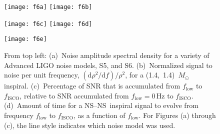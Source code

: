 \documentclass[preprint2]{aastex}
\newcommand{\NS}{NS}
\newcommand{\Msun}{\ensuremath{M_{\odot}}}
\begin{document}
\begin{figure}[b]
	\texttt{[image: f6a]}%
	\texttt{[image: f6b]}

	\texttt{[image: f6c]}%
	\texttt{[image: f6d]}

	\texttt{[image: f6e]}

	\caption{\label{fig:low-frequency-cutoff}From top left:  (a)~Noise amplitude spectral density for a variety of Advanced LIGO noise models, S5, and S6.  (b)~Normalized signal to noise per unit frequency, $(\mathrm{d}\rho^2/\mathrm{d}f)/\rho^2$, for a (1.4,~1.4)~$\Msun$ inspiral.  (c)~Percentage of SNR that is accumulated from $f_\mathrm{low}$ to $f_\mathrm{ISCO}$, relative to SNR accumulated from $f_\mathrm{low} = 0\,\mathrm{Hz}$ to $f_\mathrm{ISCO}$.    (d)~Amount of time for a \NS--\NS\ inspiral signal to evolve from frequency $f_\mathrm{low}$ to $f_\mathrm{ISCO}$, as a function of $f_\mathrm{low}$.  For Figures (a) through (c), the line style indicates which noise model was used.}
\end{figure}



\end{document}
